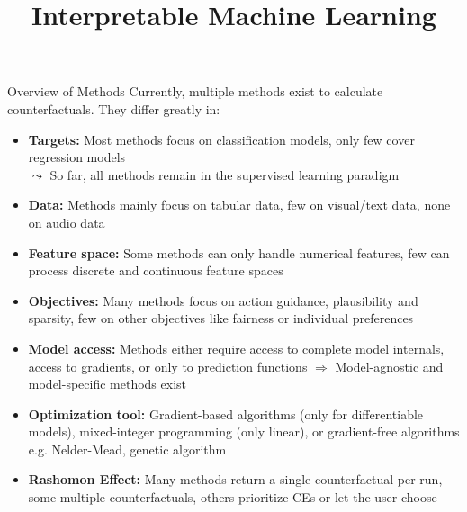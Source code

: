 \documentclass[11pt,compress,t,notes=noshow, aspectratio=169, xcolor=table]{beamer}
\title{Interpretable Machine Learning}
\date{}
\begin{document}
	
	
	
	
	
	
	\newcommand{\titlefigure}{figure/counterfactuals_heat.png}
    \newcommand{\learninggoals}{
    	\item See two strategies to generate CEs
    	\item Know problems and limitations of CEs}
	
	


\begin{frame}{Overview of Methods}
	Currently, multiple methods exist to calculate counterfactuals. They differ greatly in: 
	\begin{itemize}[<+->]
		\item \textbf{Targets:} Most methods focus on classification models, only few cover regression models\\
		$\leadsto$ So far, all methods remain in the supervised learning paradigm
		\item \textbf{Data:} Methods mainly focus on tabular data, few on visual/text data, none on audio data
		\item \textbf{Feature space:} Some methods can only handle numerical features, few can process discrete and continuous feature spaces
		\item \textbf{Objectives:} Many methods focus on action guidance, plausibility and sparsity, few on other objectives like fairness or individual preferences
		\item \textbf{Model access:} Methods either require access to complete model internals, access to gradients, or only to prediction functions $\Rightarrow$ Model-agnostic and model-specific methods exist
		\item \textbf{Optimization tool:} Gradient-based algorithms (only for differentiable models), mixed-integer programming (only linear), or gradient-free algorithms e.g. Nelder-Mead, genetic algorithm
		\item \textbf{Rashomon Effect:} Many methods return a single counterfactual per run, some multiple counterfactuals, others prioritize CEs or let the user choose
	\end{itemize}
\end{frame}
\end{document}
